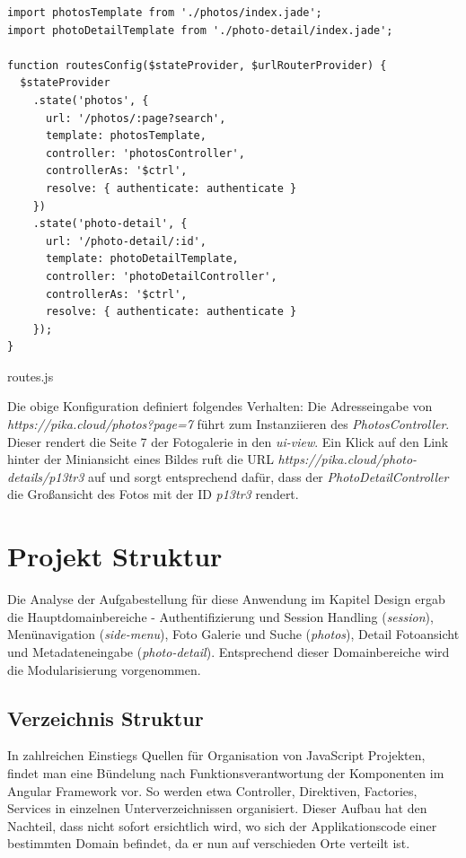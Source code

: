 \begin{listing}[H]
\begin{verbatim}
import photosTemplate from './photos/index.jade';
import photoDetailTemplate from './photo-detail/index.jade';

function routesConfig($stateProvider, $urlRouterProvider) {
  $stateProvider
    .state('photos', {
      url: '/photos/:page?search',
      template: photosTemplate,
      controller: 'photosController',
      controllerAs: '$ctrl',
      resolve: { authenticate: authenticate }
    })
    .state('photo-detail', {
      url: '/photo-detail/:id',
      template: photoDetailTemplate,
      controller: 'photoDetailController',
      controllerAs: '$ctrl',
      resolve: { authenticate: authenticate }
    });
}

\end{verbatim}
\caption{routes.js}
\label{lst:routing_config}
\end{listing}

Die obige Konfiguration definiert folgendes Verhalten:
Die Adresseingabe von \textit{https://pika.cloud/photos?page=7} führt zum Instanziieren des \textit{PhotosController}. Dieser rendert die Seite 7 der Fotogalerie in den \textit{ui-view}. Ein Klick auf den Link hinter der Miniansicht eines Bildes ruft die URL \textit{https://pika.cloud/photo-details/p13tr3} auf und sorgt entsprechend dafür, dass der \textit{PhotoDetailController} die Großansicht des Fotos mit der ID  \textit{p13tr3} rendert.

\section{Projekt Struktur}
\label{sec:project_structure}

Die Analyse der Aufgabestellung für diese Anwendung im Kapitel Design ergab die Hauptdomainbereiche -  Authentifizierung und Session Handling (\textit{session}), Menünavigation (\textit{side-menu}), Foto Galerie und Suche (\textit{photos}), Detail Fotoansicht und Metadateneingabe (\textit{photo-detail}). Entsprechend dieser Domainbereiche wird die Modularisierung vorgenommen.

\subsection{Verzeichnis Struktur}

In zahlreichen Einstiegs Quellen für Organisation von JavaScript Projekten, findet man eine Bündelung nach Funktionsverantwortung der Komponenten im Angular Framework vor. So werden etwa Controller, Direktiven, Factories, Services in einzelnen Unterverzeichnissen organisiert. Dieser Aufbau hat den Nachteil, dass nicht sofort ersichtlich wird, wo sich der Applikationscode einer bestimmten Domain befindet, da er nun auf verschieden Orte verteilt ist. 

